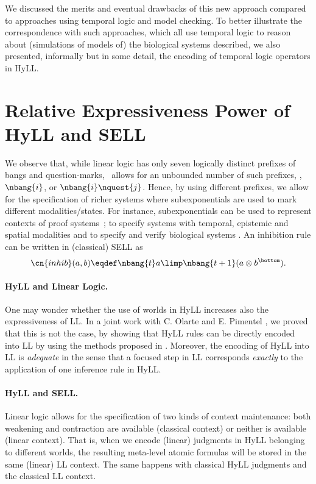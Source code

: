 \documentclass{llncs}
\begin{document}
We discussed the merits
and eventual drawbacks of this new approach compared to approaches using 
temporal logic and model checking.
To better illustrate the correspondence with such approaches, 
which all use temporal logic to reason about 
(simulations of models of) the biological systems described, 
we also 
presented, informally but in some detail,
the encoding of temporal logic operators in HyLL. 

\section{Relative Expressiveness Power of HyLL and SELL} 
\label{sec:hyll-sell}
We observe that,  while linear logic has only seven logically distinct prefixes
of bangs and question-marks, \sell\ allows for an
unbounded number of such prefixes, \eg, $\nbang{i}$, or
$\nbang{i}\nquest{j}$. 
Hence,  by using different prefixes, 
we  allow for the  specification of  richer systems where subexponentials are
used to mark different modalities/states. For instance,
subexponentials can be used to represent contexts of proof
systems~\cite{DBLP:journals/entcs/NigamPR11}; to 
specify systems with temporal, epistemic and spatial modalities 
\cite{OlartePimentelNigam:tcs-15} 
and to specify and verify biological 
systems \cite{DBLP:journals/entcs/ChiarugiFHO15}.
%
An inhibition rule can be written in (classical) SELL as
$$\cn{inhib}(a,b) \eqdef 
   \nbang{t} a \limp \nbang{t+1} (a \otimes b^\bottom).$$

\paragraph{HyLL and Linear Logic.}
One may wonder whether the use of worlds in HyLL  increases also the 
expressiveness of LL. In a joint work with C. Olarte and E. Pimentel 
\cite{Despeyroux-Olarte-Pimentel:lsfa-16},
we proved that this is not the case, by 
showing that HyLL rules can be directly encoded into LL by using the methods 
proposed in \cite{DBLP:journals/tcs/MillerP13}. 
Moreover, the encoding of HyLL into LL
is {\em adequate} in the sense that a focused step in LL corresponds 
{\em exactly} to the application of one inference rule in HyLL. 

\paragraph{HyLL and SELL.}
Linear logic allows for the specification of two kinds of context maintenance: 
both weakening and contraction are available (classical context)  or 
neither is available (linear context). 
That is,  when we encode (linear) judgments in HyLL belonging to 
different worlds, the resulting meta-level atomic formulas will be stored in 
the same (linear) LL context. The same happens with classical  HyLL judgments  
and the classical LL context.
\end{document}
